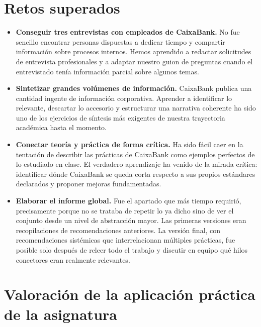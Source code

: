 \section{Retos superados}

\begin{itemize}
  \item \textbf{Conseguir tres entrevistas con empleados de CaixaBank.}
        No fue sencillo encontrar personas dispuestas a dedicar tiempo y
        compartir información sobre procesos internos. Hemos aprendido a
        redactar solicitudes de entrevista profesionales y a adaptar nuestro
        guion de preguntas cuando el entrevistado tenía información parcial
        sobre algunos temas.

  \item \textbf{Sintetizar grandes volúmenes de información.}
        CaixaBank publica una cantidad ingente de información corporativa.
        Aprender a identificar lo relevante, descartar lo accesorio y
        estructurar una narrativa coherente ha sido uno de los ejercicios
        de síntesis más exigentes de nuestra trayectoria académica hasta
        el momento.

  \item \textbf{Conectar teoría y práctica de forma crítica.}
        Ha sido fácil caer en la tentación de describir las prácticas de
        CaixaBank como ejemplos perfectos de lo estudiado en clase. El
        verdadero aprendizaje ha venido de la mirada crítica: identificar
        dónde CaixaBank se queda corta respecto a sus propios estándares
        declarados y proponer mejoras fundamentadas.

  \item \textbf{Elaborar el informe global.}
        Fue el apartado que más tiempo requirió, precisamente porque no
        se trataba de repetir lo ya dicho sino de ver el conjunto desde
        un nivel de abstracción mayor. Las primeras versiones eran
        recopilaciones de recomendaciones anteriores. La versión final,
        con recomendaciones sistémicas que interrelacionan múltiples
        prácticas, fue posible solo después de releer todo el trabajo y
        discutir en equipo qué hilos conectores eran realmente relevantes.
\end{itemize}

\section{Valoración de la aplicación práctica de la asignatura}

